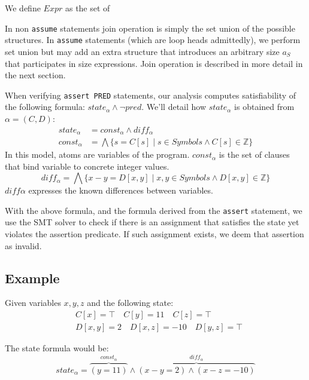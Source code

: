 We define $Expr$ as the set of  

In non \texttt{assume} statements join operation is simply the set union of the possible structures. In \texttt{assume} statements (which are loop heads admittedly), we perform set union but may add an extra structure that introduces an arbitrary size $a_S$ that participates in size expressions. Join operation is described in more detail in the next section. 

When verifying \texttt{assert PRED} statements, our analysis computes satisfiability of the following formula: $state_\alpha\land\neg pred$. We'll detail how $state_\alpha$ is obtained from $\alpha = (C,D)$:
\begin{align*}
state_\alpha & = const_\alpha \land diff_\alpha \\
const_\alpha &= \bigwedge\{s = C[s] \mid s \in Symbols \wedge C[s] \in \mathbb{Z}\}
\end{align*}
In this model, atoms are variables of the program. $const_\alpha$ is the set of clauses that bind variable to concrete integer values.
\begin{equation*}
diff_\alpha = \bigwedge\{ x - y = D[x,y] \mid x,y\in Symbols \wedge D[x,y] \in \mathbb{Z}\}
\end{equation*}
$diff\alpha$ expresses the known differences between variables.

With the above formula, and the formula derived from the \texttt{assert} statement, we use the SMT solver to check if there is an assignment that satisfies the state yet violates the assertion predicate. If such assignment exists, we deem that assertion as invalid.

\subsection*{Example}
Given variables $x,y,z$ and the following state:
\begin{align*}
&C[x] = \top \quad C[y] = 11 \quad C[z] = \top \\
&D[x,y] = 2 \quad D[x,z] = -10 \quad D[y,z] = \top
\end{align*}

The state formula would be:
\begin{equation*}
state_\alpha = \overbrace{(y=11)}^{const_\alpha}\land\overbrace{(x-y=2)\land(x-z=-10)}^{diff_\alpha}
\end{equation*}
